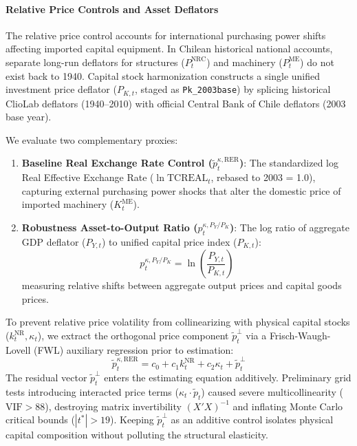 \paragraph{Relative Price Controls and Asset Deflators}
The relative price control accounts for international purchasing power shifts affecting imported capital equipment. In Chilean historical national accounts, separate long-run deflators for structures ($P_t^{\text{NRC}}$) and machinery ($P_t^{\text{ME}}$) do not exist back to 1940. Capital stock harmonization constructs a single unified investment price deflator ($P_{K,t}$, staged as \texttt{Pk\_2003base}) by splicing historical ClioLab deflators (1940--2010) with official Central Bank of Chile deflators (2003 base year).

We evaluate two complementary proxies:
\begin{enumerate}
	\item \textbf{Baseline Real Exchange Rate Control ($\tilde{p}_t^{\kappa, \text{RER}}$)}: The standardized log Real Effective Exchange Rate ($\ln\text{TCREAL}_t$, rebased to 2003 = 1.0), capturing external purchasing power shocks that alter the domestic price of imported machinery ($K_t^{\text{ME}}$).
	\item \textbf{Robustness Asset-to-Output Ratio ($p_t^{\kappa, P_Y/P_K}$)}: The log ratio of aggregate GDP deflator ($P_{Y,t}$) to unified capital price index ($P_{K,t}$):
	\begin{equation}
		p_t^{\kappa, P_Y/P_K} = \ln\left(\frac{P_{Y,t}}{P_{K,t}}\right)
	\end{equation}
	measuring relative shifts between aggregate output prices and capital goods prices.
\end{enumerate}

To prevent relative price volatility from collinearizing with physical capital stocks ($k_t^{\text{NR}}, \kappa_t$), we extract the orthogonal price component $\tilde{p}_t^\perp$ via a Frisch-Waugh-Lovell (FWL) auxiliary regression prior to estimation:
\begin{equation}
	\tilde{p}_t^{\kappa, \text{RER}} = c_0 + c_1 k_t^{\text{NR}} + c_2 \kappa_t + \tilde{p}_t^\perp
\end{equation}
The residual vector $\tilde{p}_t^\perp$ enters the estimating equation additively. Preliminary grid tests introducing interacted price terms ($\kappa_t \cdot \tilde{p}_t$) caused severe multicollinearity ($\text{VIF} > 88$), destroying matrix invertibility $(X'X)^{-1}$ and inflating Monte Carlo critical bounds ($|t^*| > 19$). Keeping $\tilde{p}_t^\perp$ as an additive control isolates physical capital composition without polluting the structural elasticity.

